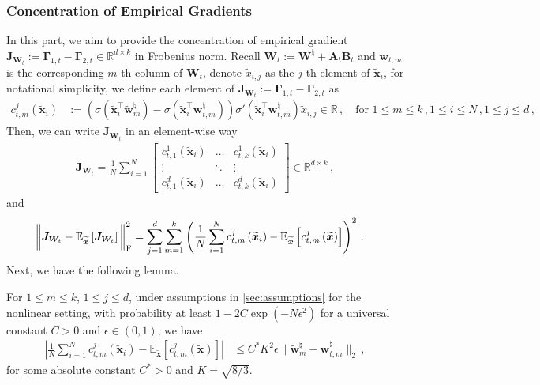 \subsubsection{Concentration of Empirical Gradients}
In this part, we aim to provide the concentration of empirical gradient $\bm J_{\bm W_t}:= \bm \Gamma_{1,t} - \bm \Gamma_{2,t} \in \mathbb{R}^{d \times k}$ in Frobenius norm. Recall $\bm W_t:=\bm W^\natural+\bm A_t \bm B_t$ and $\bm w_{t,m}$ is the corresponding $m$-th column of $\bm W_t$, denote $\widetilde{x}_{i,j}$ as the $j$-th element of $\widetilde{\bm x}_i$, for notational simplicity, we define each element of $\bm J_{\bm W_t}:= \bm \Gamma_{1,t} - \bm \Gamma_{2,t}$ as
\begin{align*}
    c^j_{t,m}\left(\widetilde{\bm x}_i\right) & := 
        \left(\sigma \left(\widetilde{\bm x}_i^{\!\top}\widetilde{\bm w}_m^\natural\right)-\sigma \left(\widetilde{\bm x}_i^{\!\top}{\bm w}_{t,m}^\natural\right)\right)\sigma' \left(\widetilde{\bm x}_i^{\!\top}\bm w_{t,m}^\natural\right)\widetilde{ x}_{i,j}\in\mathbb{R}\,,\quad \text{for }1\leq m\leq k\,,1\leq i\leq N\,,1\leq j\leq d\,,
\end{align*}
Then, we can write $\bm J_{\bm W_t}$ in an element-wise way
\begin{align*}
    \bm J_{\bm W_t} =\frac{1}{N}\sum_{i=1}^N\begin{bmatrix}
        c^1_{t,1}\left(\widetilde{\bm x}_i\right) & \hdots & c^1_{t,k}\left(\widetilde{\bm x}_i\right)\\
        \vdots & \ddots & \vdots\\
        c^d_{t,1}\left(\widetilde{\bm x}_i\right) & \hdots & c^d_{t,k}\left(\widetilde{\bm x}_i\right)
    \end{bmatrix} \in \mathbb{R}^{d \times k}\,,
\end{align*}
and
\begin{align*}
    \bigg\|\bm J_{\bm W_t} - \mathbb{E}_{\widetilde{\bm x}}\left[\bm J_{\bm W_t} \right]\bigg\|^2_{\rm F} & = \sum_{j=1}^d\sum_{m=1}^k \left(\frac{1}{N}\sum_{i=1}^N c^j_{t,m}\left(\widetilde{\bm x}_i\right)-\mathbb{E}_{\widetilde{\bm x}}\left[ c^j_{t,m}\left(\widetilde{\bm x}\right)\right]\right)^2\,.
\end{align*}
Next, we have the following lemma.
\begin{lemma}
\label{entrywise-concen}
  For $1\leq m \leq k$, $1\leq j \leq d$, under assumptions in \cref{sec:assumptions} for the nonlinear setting, with probability at least $1-2C\operatorname{exp}\left(- N\epsilon^2\right)$ for a universal constant $C>0$ and $\epsilon\in(0,1)$, we have
  \begin{align*}
      \left|\frac{1}{N}\sum_{i=1}^N c^j_{t,m}\left(\widetilde{\bm x}_i\right)-\mathbb{E}_{\widetilde{\bm x}}\left[ c^j_{t,m}\left(\widetilde{\bm x}\right)\right]\right|&\leq C^* K^2 \epsilon \|\widetilde{\bm w}_m^\natural-{\bm w}_{t,m}^\natural\|_2\,,
  \end{align*}
  for some absolute constant $C^*>0$ and $K=\sqrt{8/3}$.
\end{lemma}
